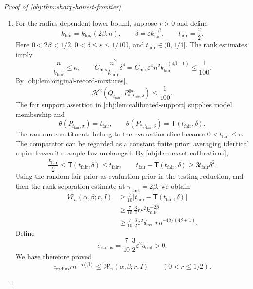 \documentclass[11pt]{article}
\begin{document}
\begin{proof}[Proof of \cref{obj:thm:sharp-honest-frontier}]
\begin{enumerate}
\item For the radius-dependent lower bound, suppose \(r>0\) and define
\[
k_{\mathrm{fair}}=k_{\mathrm{low}}(2\beta,n),
\qquad
\delta=\varepsilon k_{\mathrm{fair}}^{-\beta},
\qquad
t_{\mathrm{fair}}=\frac r2.
\]
Here \(0<2\beta<1/2\), \(0<\delta\le\varepsilon\le1/100\), and
\(t_{\mathrm{fair}}\in(0,1/4]\). The rank estimates imply
\[
\frac{n}{k_{\mathrm{fair}}}\le\kappa,
\qquad
C_{\mathrm{mix}}\frac{n^2}{k_{\mathrm{fair}}}\delta^4
=
C_{\mathrm{mix}}\varepsilon^4
n^2k_{\mathrm{fair}}^{-(4\beta+1)}
\le\frac1{100}.
\]
By \cref{obj:lem:original-record-mixtures},
\[
\mathcal H^2\!\left(
Q_{t_{\mathrm{fair}}},
P_{*,t_{\mathrm{fair}},\delta}^{\otimes n}
\right)\le\frac1{100}.
\]
The fair support assertion in \cref{obj:lem:calibrated-support} supplies
model membership and
\[
\theta(P_{t_{\mathrm{fair}},\sigma})=t_{\mathrm{fair}},
\qquad
\theta(P_{*,t_{\mathrm{fair}},\delta})
=\mathsf T(t_{\mathrm{fair}},\delta).
\]
The random constituents belong to the evaluation slice because
\(0<t_{\mathrm{fair}}\le r\). The comparator can be regarded as a constant
finite prior: averaging identical copies leaves its sample law unchanged.
By \cref{obj:lem:exact-calibrations},
\[
\frac{t_{\mathrm{fair}}}{2}
\le\mathsf T(t_{\mathrm{fair}},\delta)\le t_{\mathrm{fair}},
\qquad
t_{\mathrm{fair}}-\mathsf T(t_{\mathrm{fair}},\delta)
\ge3t_{\mathrm{fair}}\delta^2.
\]
Using the random fair prior as evaluation prior in the testing reduction,
and then the rank separation estimate at \(\gamma_{\mathrm{rank}}=2\beta\),
we obtain
\[
\begin{aligned}
\mathcal W_n(\alpha,\beta;r,I)
&\ge
\frac7{10}
\bigl[t_{\mathrm{fair}}-\mathsf T(t_{\mathrm{fair}},\delta)\bigr]\\
&\ge
\frac7{10}\,\frac32 r\varepsilon^2k_{\mathrm{fair}}^{-2\beta}\\
&\ge
\frac7{10}\,\frac32\varepsilon^2d_{\mathrm{ceil}}\,
r n^{-4\beta/(4\beta+1)}.
\end{aligned}
\]
Define
\[
c_{\mathrm{radius}}
=\frac7{10}\,\frac32\varepsilon^2d_{\mathrm{ceil}}>0.
\]
We have therefore proved
\[
c_{\mathrm{radius}}r n^{-\mathsf b(\beta)}
\le\mathcal W_n(\alpha,\beta;r,I)
\qquad(0<r\le1/2).
\]


\end{enumerate}
\end{proof}
\end{document}
